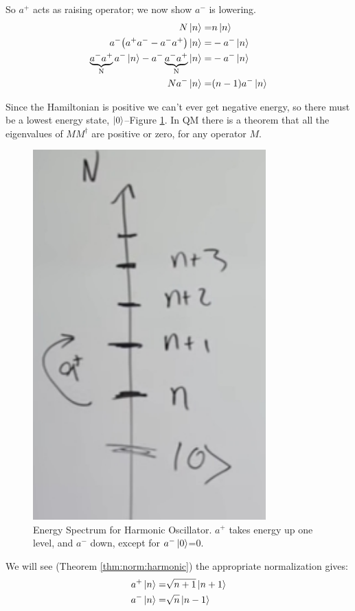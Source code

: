 \documentclass[]{article}
\begin{document}
So $a^+$ acts as raising operator; we now show $a^-$ is lowering. 
\begin{align*}
	N\ket{n} =& n \ket{n}\\
	a^-\big(a^+a^- - a^-a^+\big) \ket{n} =& -a^-\ket{n}\\
	\underbrace{a^-a^+}_\text{N}a^-\ket{n} - a^- \underbrace{a^- a^+}_\text{N} \ket{n} =& -a^-\ket{n}\\
	N a^-\ket{n} =&	(n-1)a^-\ket{n}
\end{align*}

 Since the Hamiltonian is positive we can't ever get negative energy, so there must be a lowest energy state, $\ket{0}$--Figure \ref{fig:aqm-3-spectrum}. In QM there is a theorem that all the eigenvalues of $MM^\dagger$ are positive or zero, for any operator $M$. 

\begin{figure}[H]
	\begin{center}
		\caption[Energy Spectrum for Harmonic Oscillator]{Energy Spectrum for Harmonic Oscillator. $a^+$ takes energy up one level, and $a^-$ down, except for $a^-\ket{0}$=0.}\label{fig:aqm-3-spectrum}
		\includegraphics[width=0.8\textwidth]{aqm-3-spectrum}
	\end{center}
\end{figure}
We will see (Theorem \ref{thm:norm:harmonic}) the appropriate normalization gives:
\begin{align*}
	a^+\ket{n} =& \sqrt{n+1}\ket{n+1}\\
	a^-\ket{n} =& \sqrt{n}\ket{n-1}
\end{align*}
 
\end{document}
